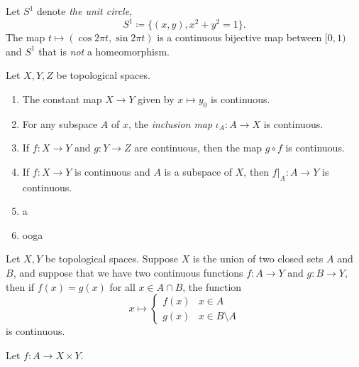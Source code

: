 \documentclass{article}
\begin{document}
\begin{example}
    Let $S^1$ denote \textit{the unit circle},
    \[
        S^1 \coloneq \{(x,y), x^2 + y^2 = 1\}.
    \]
    The map $t \mapsto (\cos 2\pi t, \sin 2 \pi t)$ is a continuous bijective map between $[0,1)$ and $S^1$ that is \textit{not} a homeomorphism.
\end{example}

\begin{theorem}
    Let $X,Y,Z$ be topological spaces.
    \begin{enumerate}[label=(\alph*)]
        \item The constant map $X \to Y$ given by $x \mapsto y_0$ is continuous.
        \item For any subspace $A$ of $x$, the \textit{inclusion map} $\iota_A: A \to X$ is continuous.
        \item If $f: X \to Y$ and $g: Y \to Z$ are continuous, then the map $g \circ f$ is continuous.
        \item If $f: X \to Y$ is continuous and $A$ is a subspace of $X$, then $f|_A: A \to Y$ is continuous.
        \item a
        \item ooga
    \end{enumerate}
\end{theorem}

\begin{theorem}
    Let $X, Y$ be topological spaces.
    Suppose $X$ is the union of two closed sets $A$ and $B$, and suppose that we have two continuous functions $f: A \to Y$ and $g: B \to Y$, then if $f(x) = g(x)$ for all $x \in A \cap B$, the function 
    \[
        x \mapsto \begin{cases}
            f(x) & x \in A \\
            g(x) & x \in B \setminus A
        \end{cases}
    \]
    is continuous.
\end{theorem}

\begin{theorem}
    Let $f: A \to X \times Y$.
\end{theorem}
\end{document}
